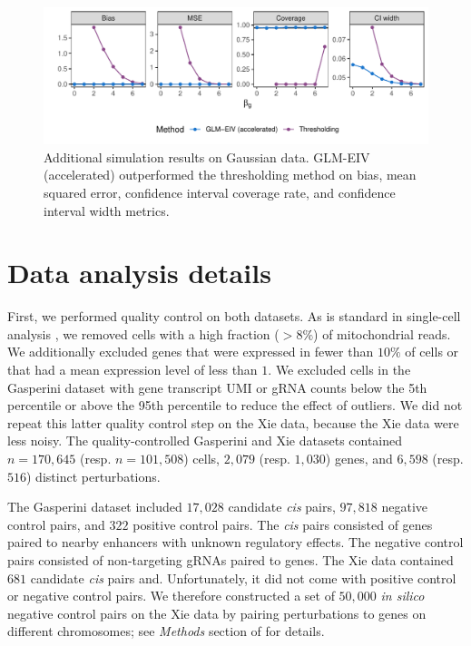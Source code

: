 \documentclass[12pt]{article}
\begin{document}
\begin{appendices}
\begin{refsection}
		\begin{figure}
			\centering
			\includegraphics[width=1.0\linewidth]{figures/sup_sim.pdf}
			\caption{Additional simulation results on Gaussian data. GLM-EIV (accelerated) outperformed the thresholding method on bias, mean squared error, confidence interval coverage rate, and confidence interval width metrics.}\label{fig:gaussian_sim}
		\end{figure}
		
		\section{Data analysis details}\label{sec:data_analysis_details}
		
		First, we performed quality control on both datasets. As is standard in single-cell analysis \parencite{Choudhary2021a}, we removed cells with a high fraction ($>8\%$) of mitochondrial reads. We additionally excluded genes that were expressed in fewer than $10\%$ of cells or that had a mean expression level of less than $1$. We excluded cells in the Gasperini dataset with gene transcript UMI or gRNA counts below the 5th percentile or above the 95th percentile to reduce the effect of outliers. We did not repeat this latter quality control step on the Xie data, because the Xie data were less noisy. The quality-controlled Gasperini and Xie datasets contained $n = 170,645$ (resp. $n = 101,508$) cells, $2,079$ (resp. $1,030$) genes, and $6,598$ (resp. $516$) distinct perturbations.
		
		The Gasperini dataset included $17,028$ candidate \textit{cis} pairs, $97,818$ negative control pairs, and $322$ positive control pairs. The \textit{cis} pairs consisted of genes paired to nearby enhancers with unknown regulatory effects. The negative control pairs consisted of non-targeting gRNAs paired to genes. The Xie data contained $681$ candidate \textit{cis} pairs and. Unfortunately, it did not come with positive control or negative control pairs. We therefore constructed a set of $50,000$ \textit{in silico} negative control pairs on the Xie data by pairing perturbations to genes on different chromosomes; see \textit{Methods} section of \parencite{Barry2021} for details.
		

\end{refsection}
\end{appendices}
\end{document}
